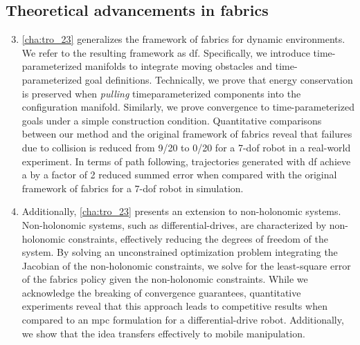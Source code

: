 \subsection{Theoretical advancements in \ac{fabrics}}
\begin{enumerate}
    \setcounter{enumi}{2}
    \item \cref{cha:tro_23} generalizes the framework of \ac{fabrics}
      for dynamic environments. We refer to the resulting
      framework as \ac{df}. Specifically, we introduce
      time-parameterized manifolds to integrate moving
      obstacles and time-parameterized goal definitions.
      Technically,
      we prove that energy conservation is preserved when
      \textit{pulling} timeparameterized components into
      the configuration manifold. 
      Similarly, we prove convergence to
      time-parameterized goals under a simple construction
      condition. Quantitative comparisons between our method
      and the original framework of \ac{fabrics} reveal
      that failures due to collision is reduced from 9/20
      to 0/20 for a 7-\ac{dof} robot in a real-world experiment.
      In terms of path following, trajectories generated
      with \ac{df} achieve a by a factor of 2 reduced summed error 
      when compared with the original framework of
      \ac{fabrics} for a 7-\ac{dof} robot in simulation.
    \item Additionally, \cref{cha:tro_23} presents an extension to
      non-holonomic systems. Non-holonomic systems, such as
      differential-drives, are characterized by
      non-holonomic constraints, effectively reducing the
      degrees of freedom of the system. By solving an
      unconstrained optimization problem integrating the
      Jacobian of the non-holonomic constraints, we solve
      for the least-square error of the \ac{fabrics} policy
      given the non-holonomic constraints. While we
      acknowledge the breaking of convergence guarantees,
      quantitative experiments reveal that this approach leads to
      competitive results when compared to an \ac{mpc}
      formulation for a differential-drive robot.
      Additionally, we show that the idea transfers effectively
      to mobile manipulation.
\end{enumerate}


